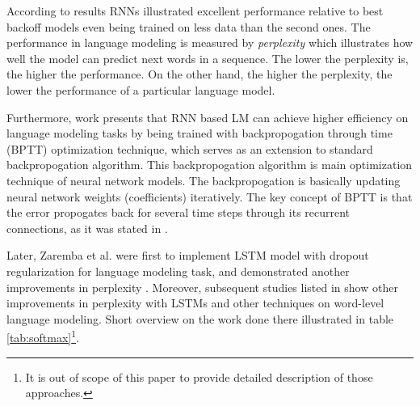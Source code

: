 \documentclass{IEEEtran}
\begin{document}
According to \cite{Mikolov2010NeuralLM} results RNNs illustrated excellent performance relative to best backoff models even being trained on less data than the second ones. The performance in language modeling is measured by \textit{perplexity} which illustrates how well the model can predict next words in a sequence. The lower the perplexity is, the higher the performance. On the other hand, the higher the perplexity, the lower the performance of a particular language model.

Furthermore, \cite{Mikolov2011ExtensionsOR} work presents that RNN based LM can achieve higher efficiency on language modeling tasks by being trained with backpropogation through time (BPTT) optimization technique, which serves as an extension to standard backpropogation algorithm. This backpropogation algorithm is main optimization technique of neural network models. The backpropogation is basically updating neural network weights (coefficients) iteratively. The key concept of BPTT is that the error propogates back for several time steps through its recurrent connections, as it was stated in \cite{Mikolov2011ExtensionsOR}.

Later, Zaremba et al. were first to implement LSTM model with dropout regularization for language modeling task, and demonstrated another improvements in perplexity \cite{Zaremba2014LSTM}. Moreover, subsequent studies listed in \cite{Salakhutdinov2017Softmax} show other improvements in perplexity with LSTMs and other techniques on word-level language modeling. Short overview on the work done there illustrated in table \ref{tab:softmax}\footnote{It is out of scope of this paper to provide detailed description of those approaches.}.
\end{document}
